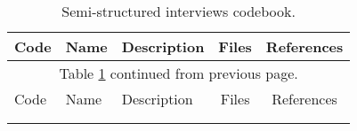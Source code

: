 \begin{landscape}
\footnotesize
\singlespacing
\begin{longtable}[c]{@{}ll p{6cm}cc@{}}
\caption[Codebook]{Semi-structured interviews codebook. \label{tab:codebook}} \\

\toprule
Code & Name & Description & Files & References \\ 
\endfirsthead

\multicolumn{5}{c}{Table \ref{tab:codebook} continued from previous page.}\\
\toprule
Code & Name & Description & Files & References \\ 
\midrule
\endhead

\bottomrule \\
\endfoot

\bottomrule
\endlastfoot


\end{longtable}
\end{landscape}
